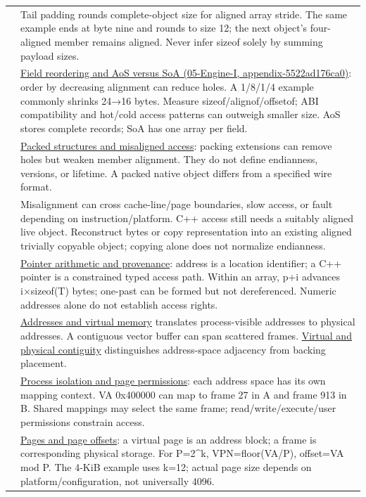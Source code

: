 {\begin{longtable}[]{@{}
  >{\raggedright\arraybackslash}p{}
  >{\raggedright\arraybackslash}p{}@{}}
47 & Tail padding rounds complete-object size for aligned array stride. The same example ends at byte nine and rounds to size 12; the next object's four-aligned member remains aligned. Never infer sizeof solely by summing payload sizes. \\
48 & \href{../05-Engine-I/main.pdf\#nameddest=appendix-5522ad176ca0}{Field reordering and AoS versus SoA (05-Engine-I, appendix-5522ad176ca0)}: order by decreasing alignment can reduce holes. A 1/8/1/4 example commonly shrinks 24→16 bytes. Measure sizeof/alignof/offsetof; ABI compatibility and hot/cold access patterns can outweigh smaller size. AoS stores complete records; SoA has one array per field. \\
49 & \hyperref[appendix-0682dbfc5f0e]{Packed structures and misaligned access}: packing extensions can remove holes but weaken member alignment. They do not define endianness, versions, or lifetime. A packed native object differs from a specified wire format. \\
50 & Misalignment can cross cache-line/page boundaries, slow access, or fault depending on instruction/platform. C++ access still needs a suitably aligned live object. Reconstruct bytes or copy representation into an existing aligned trivially copyable object; copying alone does not normalize endianness. \\
51 & \hyperref[appendix-6af5921bc853]{Pointer arithmetic and provenance}: address is a location identifier; a C++ pointer is a constrained typed access path. Within an array, p+i advances i×sizeof(T) bytes; one-past can be formed but not dereferenced. Numeric addresses alone do not establish access rights. \\
52 & \hyperref[appendix-18ee4f913c3c]{Addresses and virtual memory} translates process-visible addresses to physical addresses. A contiguous vector buffer can span scattered frames. \hyperref[appendix-f897c1ddac8f]{Virtual and physical contiguity} distinguishes address-space adjacency from backing placement. \\
53 & \hyperref[appendix-c2a9ad1e2b49]{Process isolation and page permissions}: each address space has its own mapping context. VA 0x400000 can map to frame 27 in A and frame 913 in B. Shared mappings may select the same frame; read/write/execute/user permissions constrain access. \\
54 & \hyperref[appendix-0c67cd5bf30a]{Pages and page offsets}: a virtual page is an address block; a frame is corresponding physical storage. For P=2\^{}k, VPN=floor(VA/P), offset=VA mod P. The 4-KiB example uses k=12; actual page size depends on platform/configuration, not universally 4096. \\

\end{longtable}}
